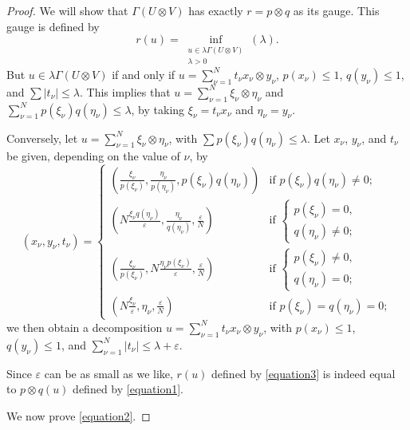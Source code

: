 \documentclass{article}
\theoremstyle{plain}
\theoremstyle{definition}
\renewcommand{\leq}{\leqslant}
\newcommand{\oldpage}[1]{\marginpar{\footnotesize$\Big\vert$ \textit{p.~#1}}}
\begin{document}
\begin{proof}
\oldpage{4}
  We will show that $\Gamma(U\otimes V)$ has exactly $r=p\otimes q$ as its gauge.
  This gauge is defined by
  \[
  \label{equation3}
    r(u) = \inf_{\substack{u\in\lambda\Gamma(U\otimes V)\\\lambda>0}}(\lambda).
  \tag{3}
  \]
  But $u\in\lambda\Gamma(U\otimes V)$ if and only if $u=\sum_{\nu=1}^N t_\nu x_\nu \otimes y_\nu$, $p(x_\nu)\leq1$, $q(y_\nu)\leq1$, and $\sum|t_\nu|\leq\lambda$.
  This implies that $u=\sum_{\nu=1}^N\xi_\nu\otimes\eta_\nu$ and $\sum_{\nu=1}^N p(\xi_\nu)q(\eta_\nu)\leq\lambda$, by taking $\xi_\nu=t_\nu x_\nu$ and $\eta_\nu=y_\nu$.

  Conversely, let $u=\sum_{\nu=1}^N \xi_\nu\otimes\eta_\nu$, with $\sum p(\xi_\nu)q(\eta_\nu)\leq\lambda$.
  Let $x_\nu$, $y_\nu$, and $t_\nu$ be given, depending on the value of $\nu$, by
  \[
    (x_\nu,y_\nu,t_\nu) =
    \begin{cases}
      \left(
        \frac{\xi_\nu}{p(\xi_\nu)}, \frac{\eta_\nu}{p(\eta_\nu)}, p(\xi_\nu)q(\eta_\nu)
      \right) &\mbox{if }
      p(\xi_\nu)q(\eta_\nu)\neq0;
    \\\left(
        N\frac{\xi_\nu q(\eta_\nu)}{\varepsilon}, \frac{\eta_\nu}{q(\eta_\nu)}, \frac{\varepsilon}{N}
      \right) &\mbox{if }
      \begin{cases}
        p(\xi_\nu)=0,
      \\q(\eta_\nu)\neq0;
      \end{cases}
    \\\left(
        \frac{\xi_\nu}{p(\xi_\nu)}, N\frac{\eta_\nu p(\xi_\nu)}{\varepsilon}, \frac{\varepsilon}{N}
      \right) &\mbox{if }
      \begin{cases}
        p(\xi_\nu)\neq0,
      \\q(\eta_\nu)=0;
      \end{cases}
    \\\left(
        N\frac{\xi_\nu}{\varepsilon}, \eta_\nu, \frac{\varepsilon}{N}
      \right) &\mbox{if }
      p(\xi_\nu) = q(\eta_\nu) = 0;
    \end{cases}
  \]
  we then obtain a decomposition $u=\sum_{\nu=1}^N t_\nu x_\nu\otimes y_\nu$, with $p(x_\nu)\leq1$, $q(y_\nu)\leq1$, and $\sum_{\nu=1}^N|t_\nu|\leq\lambda+\varepsilon$.

  Since $\varepsilon$ can be as small as we like, $r(u)$ defined by \cref{equation3} is indeed equal to $p\otimes q(u)$ defined by \cref{equation1}.

  We now prove \cref{equation2}.
\end{proof}
\end{document}
